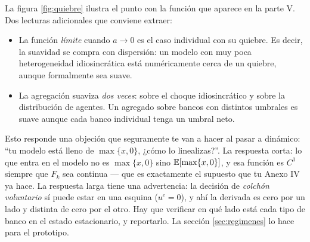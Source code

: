 La figura \ref{fig:quiebre} ilustra el punto con la función que aparece en la
parte V. Dos lecturas adicionales que conviene extraer:

\begin{itemize}[leftmargin=1.4em]
\item La función \emph{límite} cuando $a\to 0$ es el caso individual con su
quiebre. Es decir, la suavidad se compra con dispersión: un modelo con muy poca
heterogeneidad idiosincrática está numéricamente cerca de un quiebre, aunque
formalmente sea suave.
\item La agregación suaviza \emph{dos veces}: sobre el choque idiosincrático y
sobre la distribución de agentes. Un agregado sobre bancos con distintos
umbrales es suave aunque cada banco individual tenga un umbral neto.
\end{itemize}

\begin{tutesis}
Esto responde una objeción que seguramente te van a hacer al pasar a dinámico:
``tu modelo está lleno de $\max\{x,0\}$, ¿cómo lo linealizas?''. La respuesta
corta: lo que entra en el modelo no es $\max\{x,0\}$ sino
$\mathbb{E}[\max\{x,0\}]$, y esa función es $C^1$ siempre que $F_k$ sea continua ---
que es exactamente el supuesto que tu Anexo IV ya hace. La respuesta larga tiene
una advertencia: la decisión de \emph{colchón voluntario} sí puede estar en una
esquina ($u^c = 0$), y ahí la derivada es cero por un lado y distinta de cero
por el otro. Hay que verificar en qué lado está cada tipo de banco en el estado
estacionario, y reportarlo. La sección \ref{sec:regimenes} lo hace para el
prototipo.
\end{tutesis}
